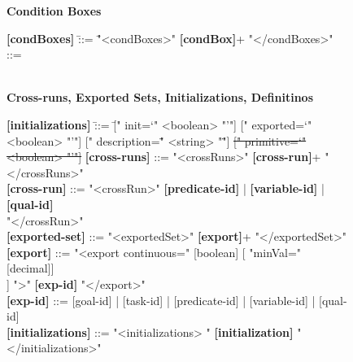 \begin{figure}[hp!]
\begin{tcolorbox}[title=iStar-DT-X Grammar,colbacktitle=orange!40!white,coltitle=black,fonttitle=\bfseries,adjusted title=iStarDT-X Grammar (3/3),halign title=flush center]
\begin{scriptsize}
\vspace{-2mm}
\rmfamily
\begin{footnotesize}
\textbf{Condition Boxes}
\end{footnotesize}
\ttfamily
\vspace{-3mm}

\begin{scriptsize}
\begin{tabbing}
\textbf{[condBoxes]} \= ::= \= "<condBoxes>" \textbf{[condBox]}+ "</condBoxes>"\\
\red{\textbf{[condBox]}} \> ::=  \\ 
\> \> \\
\end{tabbing}
\end{scriptsize}

\vspace{-2mm}

\rmfamily
\begin{footnotesize}
\textbf{Cross-runs, Exported Sets, Initializations, Definitinos}
\end{footnotesize}
\ttfamily
\vspace{-3mm}
\begin{scriptsize}
\begin{tabbing}
\textbf{[initializations]} \= ::= \= [" init=`" <boolean> "'"] [" exported=`" <boolean> "'"] [" description=\"" <string> "\""] \sout{[" primitive=`" <boolean> "'"]} \kill
\textbf{[cross-runs]} \> ::= "<crossRuns>" \textbf{[cross-run]}+ "</crossRuns>" \\
\textbf{[cross-run]} \> ::= "<crossRun>" \textbf{[predicate-id]} | \textbf{[variable-id]} | \textbf{[qual-id]}\\\>\> "</crossRun>" \\
\textbf{[exported-set]} \> ::= "<exportedSet>" \textbf{[export]}+ "</exportedSet>" \\
\textbf{[export]} \> ::= "<export continuous=" [boolean] [ "minVal=" [decimal]] \\\>\> [" maxVal=" [decimal] ] ">"  \textbf{[exp-id]} "</export>" \\
\textbf{[exp-id]} \> ::= [goal-id] | [task-id] | [predicate-id] | [variable-id] | [qual-id] \\
\textbf{[initializations]}\> ::= "<initializations> " \textbf{[initialization]} "</initializations>" \\


\end{tabbing}
\end{scriptsize}
\end{scriptsize}
\end{tcolorbox}
\end{figure}

